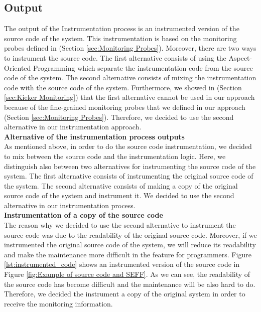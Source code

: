 \subsection{Output}
\label{sec:output}

The output of the Instrumentation process is an instrumented version of the source code of the system.  This instrumentation is based on the monitoring probes defined in (Section \ref{sec:Monitoring Probes}). Moreover, there are two ways to instrument the source code. The first alternative consists of using the Aspect-Oriented Programming which separate the instrumentation code from the source code of the system. The second alternative consists of mixing the instrumentation code with the source code of the system. Furthermore, we showed in (Section \ref{sec:Kieker Monitoring}) that the first alternative cannot be used in our approach because of the fine-grained monitoring probes that we defined in our approach (Section \ref{sec:Monitoring Probes}). Therefore, we decided to use the second alternative in our instrumentation approach.\\

 \textbf{Alternative of the instrumentation process outputs}\\
As mentioned above, in order to do the source code instrumentation, we decided to mix between the source code and the instrumentation logic.  Here, we distinguish also between two alternatives for instrumenting the source code of the system. The first alternative consists of instrumenting the original source code of the system. The second alternative consists of making a copy of the original source code of the system and instrument it. We decided to use the second alternative in our instrumentation process. \\

\textbf{Instrumentation of a copy of the source code}\\
The reason why we decided to use the second alternative to instrument the source code was due to the readability of the original source code. Moreover, if we instrumented the original source code of the system, we will reduce its readability and make the maintenance more difficult in the feature for programmers. Figure \ref{lst:instrumented_code} shows an instrumented version of the source code in Figure \ref{fig:Example of source code and SEFF}. As we can see, the readability of the source code has become difficult and the maintenance will be also hard to do. Therefore, we decided the instrument a copy of the original system in order to receive the monitoring information.


